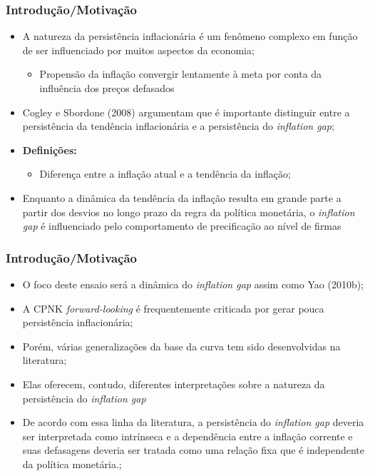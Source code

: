 \documentclass[aspectratio=169]{beamer}
\begin{document}
\begin{frame}\frametitle{Introdução/Motivação}
  \begin{itemize}
  \item A natureza da persistência inflacionária é um fenômeno complexo em função de ser influenciado por muitos aspectos da economia;
    \begin{itemize}
    \item Propensão da inflação convergir lentamente à meta por conta da influência dos preços defasados
    \end{itemize}
  \item Cogley e Sbordone (2008) argumentam que é importante distinguir entre a persistência da tendência inflacionária e a persistência do \emph{inflation gap};
  \item \textbf{Definições:}
    \begin{itemize}
    \item Diferença entre a inflação atual e a tendência da inflação;
    \end{itemize}
  \item Enquanto a dinâmica da tendência da inflação resulta em grande parte a partir dos desvios no longo prazo da regra da política monetária, o \emph{inflation gap} é influenciado pelo comportamento de precificação ao nível de firmas
  \end{itemize}
\end{frame}

\begin{frame}\frametitle{Introdução/Motivação}
  \begin{itemize}
  \item O foco deste ensaio será a dinâmica do \emph{inflation gap} assim como Yao (2010b);
  \item A CPNK \emph{forward-looking} é frequentemente criticada por gerar pouca persistência inflacionária;
  \item Porém, várias generalizações da base da curva tem sido desenvolvidas na literatura;
  \item Elas oferecem, contudo, diferentes interpretações sobre a natureza da persistência do \emph{inflation gap}
  \item De acordo com essa linha da literatura, a persistência do \emph{inflation gap} deveria ser interpretada como intrínseca e a dependência entre a inflação corrente e suas defasagens deveria ser tratada como uma relação fixa que é independente da política monetária.;
  \end{itemize}
\end{frame}
\end{document}
